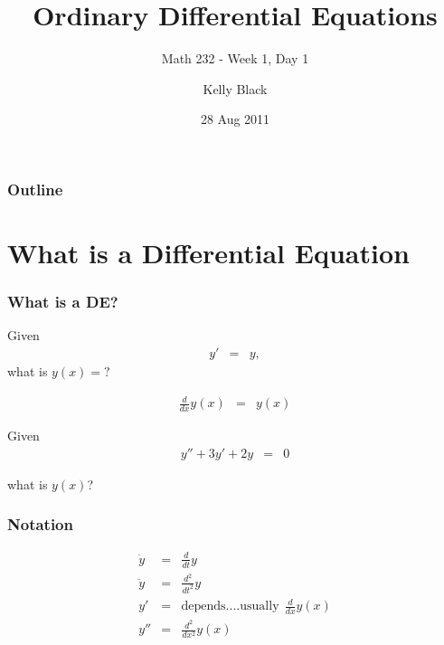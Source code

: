 \documentclass{beamer}
\newcommand{\deriv}[2]{\frac{d}{d#2}#1}
\newcommand{\derivTwo}[2]{\frac{d^2}{d#2^2}#1}
\begin{document}
\title{Ordinary Differential Equations}
\subtitle{Math 232 - Week 1, Day 1}

\author{Kelly Black}
\date{28 Aug 2011}

\begin{frame}
  \titlepage
\end{frame}

\begin{frame}
  \frametitle{Outline}
\end{frame}


\section{What is a Differential Equation}


\begin{frame}
  \frametitle{What is a DE?}

  Given
  \begin{eqnarray*}
    y' & = & y,
  \end{eqnarray*}
  what is $y(x)=?$

  \begin{eqnarray*}
    \deriv{y(x)}{x} & = & y(x)
  \end{eqnarray*}

\end{frame}


\begin{frame}
  Given
  \begin{eqnarray*}
    y'' + 3y' +2y & = & 0
  \end{eqnarray*}

  what is $y(x)$?

\end{frame}

\begin{frame}
  \frametitle{Notation}
  \begin{eqnarray*}
    \dot{y} & = & \deriv{y}{t} \\
    \ddot{y} & = & \derivTwo{y}{t} \\
    y' & = & \mathrm{depends.... usually ~~} \deriv{y(x)}{x} \\
    y'' & = & \derivTwo{y(x)}{x}
  \end{eqnarray*}
\end{frame}
\end{document}
